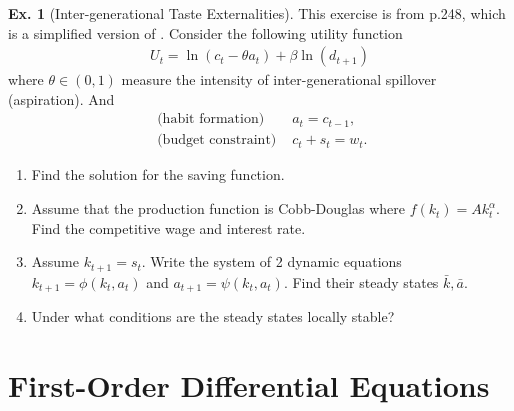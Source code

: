 \documentclass[11pt,a4paper]{book}
\theoremstyle{definition}\newtheorem{definition}{Definition}
\theoremstyle{definition}\newtheorem{fact}{Fact}
\theoremstyle{definition}\newtheorem{remark}{Remark}
\theoremstyle{definition}\newtheorem{ex}{Ex.}
\theoremstyle{definition}\newtheorem{project}{Project}
\theoremstyle{definition}\newtheorem{problem}{Problem}
\theoremstyle{definition}\newtheorem{example}{Example}
\numberwithin{theorem}{section}
\numberwithin{corollary}{chapter}
\numberwithin{assumption}{chapter}
\numberwithin{definition}{chapter}
\numberwithin{prop}{chapter}
\numberwithin{notation}{chapter}
\numberwithin{problem}{chapter}
\numberwithin{example}{chapter}
\numberwithin{fact}{chapter}
\numberwithin{ex}{chapter}
\begin{document}
	\begin{ex}[Inter-generational Taste Externalities]
		\label{ex:dynamic} This exercise is from \citet{de2002theory} p.248, which is a simplified version of \citet{de1996dynamics}. Consider the following utility function
		\begin{align*}
			U_t = \ln(c_t - \theta a_t ) + \beta \ln(d_{t+1})
		\end{align*}
		where $\theta \in (0,1)$ measure the intensity of inter-generational spillover (aspiration). And
		\begin{align*}
			\text{ (habit formation) } & a_t = c_{t-1}, \\
			\text{ (budget constraint) } & c_t + s_t = w_t.
		\end{align*}
		\begin{enumerate}
			\item Find the solution for the saving function.
			\item Assume that the production function is Cobb-Douglas where $f(k_t) = A k_t^\alpha$. Find the competitive wage and interest rate.
			\item Assume $k_{t+1} = s_t$. Write the system of 2 dynamic equations $k_{t+1} = \phi (k_t, a_t)$ and $a_{t+1} = \psi (k_t, a_t)$. Find their steady states $\bar{k}, \bar{a}$.
			\item Under what conditions are the steady states locally stable?
		\end{enumerate}
	\end{ex}
	
	\chapter{First-Order Differential Equations}
\end{document}

